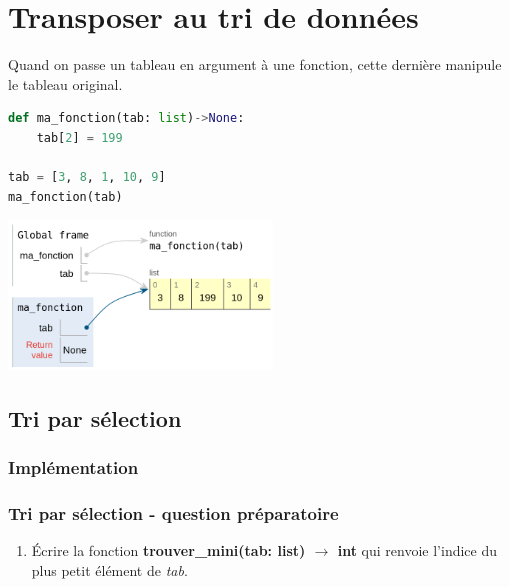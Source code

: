 \documentclass[svgnames,11pt]{beamer}
\begin{document}
\section{Transposer au tri de données}
\begin{frame}[fragile]
Quand on passe un tableau en argument à une fonction, cette dernière manipule le tableau original.
\begin{center}
\begin{lstlisting}[language=Python]
def ma_fonction(tab: list)->None:
    tab[2] = 199
    
tab = [3, 8, 1, 10, 9]
ma_fonction(tab)
\end{lstlisting}
\end{center}
\begin{center}
\centering
\includegraphics[width=7cm]{ressources/tutor-mutable.png}
\label{IMG}
\end{center}
\end{frame}

\subsection{Tri par sélection}
\subsubsection{Implémentation}
\begin{frame}
    \frametitle{Tri par sélection - question préparatoire}

    \begin{activite}
        \begin{enumerate}
            \item Écrire la fonction \textbf{trouver\_mini(tab: list) $\rightarrow$ int} qui renvoie l'indice du plus petit élément de \emph{tab}.
        \end{enumerate}
    \end{activite}

\end{frame}
\end{document}
